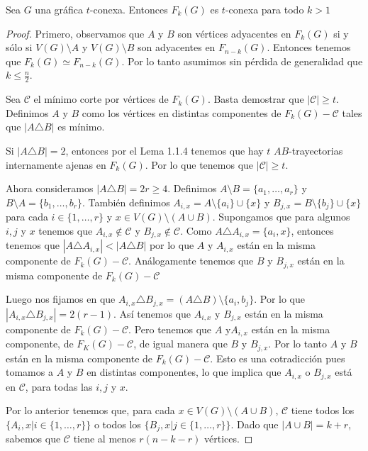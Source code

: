 \begin{teorema}%
\label{teo:segundo}
    Sea $G$ una gr\'afica $t$-conexa. Entonces $F_{k}(G)$ es $t$-conexa para
    todo $k>1$
\end{teorema}
        
\begin{proof}
Primero, observamos que $A$ y $B$ son v\'ertices adyacentes en $F_k(G)$ si y
s\'olo si $V(G) \setminus A$ y $V(G)\setminus B$ son adyacentes en $F_{n-k}(G)$.
Entonces tenemos que $F_k(G) \simeq F_{n-k}(G)$. Por lo tanto asumimos sin
p\'erdida de generalidad que $k \leq \frac{n}{2}$.

Sea $\mathcal{C}$ el m\'i{}nimo corte por v\'ertices de $F_k(G)$. Basta
demostrar que $|\mathcal{C}| \geq t$. Definimos $A$ y $B$ como los v\'ertices en
distintas componentes de $F_k(G)- \mathcal{C}$ tales que $|A \triangle B|$ es
m\'i{}nimo.

Si $|A \triangle B| = 2$, entonces por el Lema 1.1.4 tenemos que hay $t$
$AB$-trayectorias internamente ajenas en $F_k(G)$. Por lo que tenemos que
$|\mathcal{C}| \geq t$.

Ahora consideramos $|A \triangle B| = 2r \geq 4$. Definimos $A \setminus B
=\{a_1, \dots, a_r\}$ y $B \setminus A =\{b_1, \dots, b_r\}$. Tambi\'en
definimos $A_{i,x} = A\setminus \{a_i\} \cup \{x\}$ y $B_{j,x} = B\setminus
\{b_j\} \cup \{x\}$ para cada $i \in \{1, \dots, r\}$ y $x \in V(G)\setminus
(A\cup B)$. Supongamos que para algunos $i, j$ y $x$ tenemos que $A_{i,x} \notin
\mathcal{C}$ y $B_{j,x} \notin \mathcal{C}$. Como $A \triangle A_{i,x} = \{a_i,
x\}$, entonces tenemos que $|A \triangle A_{i,x}|< |A \triangle B|$ por lo que
$A$ y $A_{i,x}$ est\'an en la misma componente de $F_k(G)- \mathcal{C}$.
An\'alogamente tenemos que  $B$ y $B_{j,x}$ est\'an en la misma componente de
$F_k(G)-\mathcal{C}$

Luego nos fijamos en que $A_{i,x} \triangle B_{j,x} = (A \triangle B) \setminus
\{a_i, b_j\}$. Por lo que $|A_{i,x} \triangle B_{j,x}| = 2(r-1)$. As\'i{}
tenemos que $A_{i,x}$ y $B_{j,x}$ est\'an en la misma componente de $F_k(G)-
\mathcal{C}$. Pero tenemos que $A$ y$A_{i,x}$ est\'an en la misma componente, de
$F_K(G) - \mathcal{C}$, de igual manera que $B$ y $B_{j,x}$. Por lo tanto $A$ y
$B$ est\'an en la misma componente de $F_k(G)- \mathcal{C}$. Esto es una
cotradicci\'on pues tomamos a $A$ y $B$ en distintas componentes, lo que implica
que $A_{i,x}$ o $B_{j,x}$ est\'a en $\mathcal{C}$, para todas las $i,j$ y $x$.

Por lo anterior tenemos que, para cada $x \in V(G)\setminus (A \cup B)$,
$\mathcal{C}$ tiene todos los $\{A_i,x | i \in \{1, \dots, r\}\}$ o todos los
$\{B_j,x | j \in \{1, \dots, r\}\}$. Dado que $|A\cup B|=k +r$, sabemos que
$\mathcal{C}$ tiene al menos $r(n-k-r)$ v\'ertices.


\end{proof}
